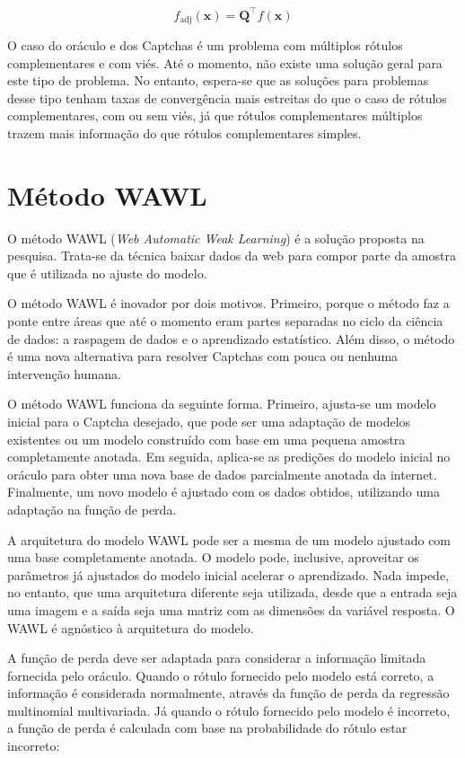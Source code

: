 \documentclass[12pt,twoside,brazilian]{book}
\begin{document}
\[
f_{\text{adj}} (\mathbf x) = \mathbf Q ^{\top}f(\mathbf x)
\]

O caso do oráculo e dos Captchas é um problema com múltiplos rótulos
complementares e com viés. Até o momento, não existe uma solução geral
para este tipo de problema. No entanto, espera-se que as soluções para
problemas desse tipo tenham taxas de convergência mais estreitas do que
o caso de rótulos complementares, com ou sem viés, já que rótulos
complementares múltiplos trazem mais informação do que rótulos
complementares simples.

\hypertarget{sec-wawl}{%
\section{Método WAWL}\label{sec-wawl}}

O método WAWL (\emph{Web Automatic Weak Learning}) é a solução proposta
na pesquisa. Trata-se da técnica baixar dados da web para compor parte
da amostra que é utilizada no ajuste do modelo.

O método WAWL é inovador por dois motivos. Primeiro, porque o método faz
a ponte entre áreas que até o momento eram partes separadas no ciclo da
ciência de dados: a raspagem de dados e o aprendizado estatístico. Além
disso, o método é uma nova alternativa para resolver Captchas com pouca
ou nenhuma intervenção humana.

O método WAWL funciona da seguinte forma. Primeiro, ajusta-se um modelo
inicial para o Captcha desejado, que pode ser uma adaptação de modelos
existentes ou um modelo construído com base em uma pequena amostra
completamente anotada. Em seguida, aplica-se as predições do modelo
inicial no oráculo para obter uma nova base de dados parcialmente
anotada da internet. Finalmente, um novo modelo é ajustado com os dados
obtidos, utilizando uma adaptação na função de perda.

A arquitetura do modelo WAWL pode ser a mesma de um modelo ajustado com
uma base completamente anotada. O modelo pode, inclusive, aproveitar os
parâmetros já ajustados do modelo inicial acelerar o aprendizado. Nada
impede, no entanto, que uma arquitetura diferente seja utilizada, desde
que a entrada seja uma imagem e a saída seja uma matriz com as dimensões
da variável resposta. O WAWL é agnóstico à arquitetura do modelo.

A função de perda deve ser adaptada para considerar a informação
limitada fornecida pelo oráculo. Quando o rótulo fornecido pelo modelo
está correto, a informação é considerada normalmente, através da função
de perda da regressão multinomial multivariada. Já quando o rótulo
fornecido pelo modelo é incorreto, a função de perda é calculada com
base na probabilidade do rótulo estar incorreto:
\end{document}
